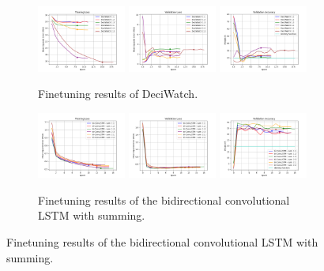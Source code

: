 \documentclass[./main.tex]{subfiles}
\begin{document}
\begin{figure}[htbp]
    \begin{subfigure}[b]{\textwidth}
        \centering
        \includegraphics[width=0.32\textwidth]{./entities/finetuned/deciwatch/train_losses.png}
        \includegraphics[width=0.32\textwidth]{./entities/finetuned/deciwatch/val_losses.png}
        \includegraphics[width=0.32\textwidth]{./entities/finetuned/deciwatch/val_accs.png}
        \caption{Finetuning results of DeciWatch.}
    \end{subfigure}
   \hfill

   \begin{subfigure}[b]{\textwidth}
    \centering
    \includegraphics[width=0.32\textwidth]{./entities/finetuned/unipose/train_losses.png}
    \includegraphics[width=0.32\textwidth]{./entities/finetuned/unipose/val_losses.png}
    \includegraphics[width=0.32\textwidth]{./entities/finetuned/unipose/val_accs.png}
    \caption{Finetuning results of the bidirectional convolutional LSTM with summing.}
    \end{subfigure}
    \hfill


\end{figure}
\end{document}
